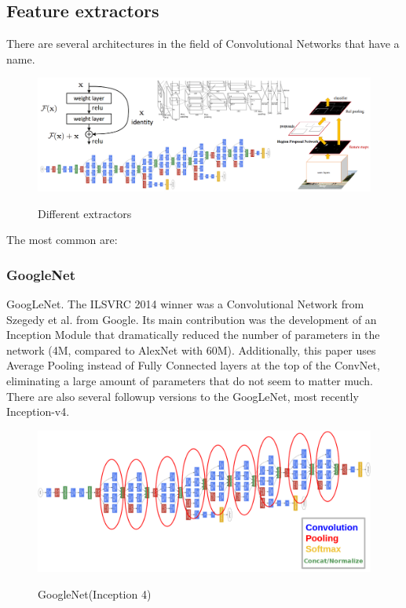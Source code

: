 \documentclass[12pt]{article}
\begin{document}
    \subsection{Feature extractors}
    There are several architectures in the field of Convolutional Networks that have a name.
    \begin{figure}[h]
    	\centering
\includegraphics[width=1\textwidth]{ince.png}
       	\label{fig:mesh17}
	 	 \caption{Different extractors}
	\end{figure} 
	     The most common are:
    
        \subsubsection{GoogleNet}
        GoogLeNet. The ILSVRC 2014 winner was a Convolutional Network from Szegedy et al. from Google. Its main contribution was the development of an Inception Module that dramatically reduced the number of parameters in the network (4M, compared to AlexNet with 60M). Additionally, this paper uses Average Pooling instead of Fully Connected layers at the top of the ConvNet, eliminating a large amount of parameters that do not seem to matter much. There are also several followup versions to the GoogLeNet, most recently Inception-v4.
        \begin{figure}[h]
    	\centering
        \includegraphics[width=1\textwidth]{gnet.png}
       	\label{fig:mesh18}
	\caption{GoogleNet(Inception 4)}
	\end{figure} 
        
\end{document}
